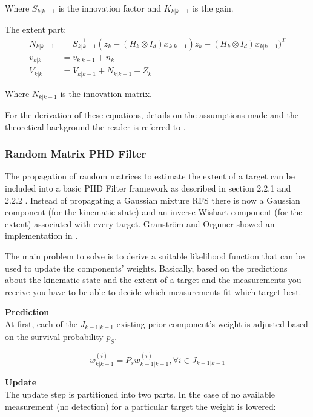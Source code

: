 Where $S_{k|k-1}$ is the innovation factor and $K_{k|k-1}$ is the gain.

The extent part:
\begin{equation}
\begin{split}
    N_{k|k-1} &= S_{k|k-1}^{-1} (z_k -(H_k \otimes I_d)x_{k|k-1}) z_k - (H_k \otimes I_d) x_{k|k-1})^T \\
    v_{k|k} &= v_{k|k-1} + n_k \\
    V_{k|k} &= V_{k|k-1} + N_{k|k-1} + Z_k
\end{split}
\label{eq:ellip_update_ext}
\end{equation}

Where $N_{k|k-1}$ is the innovation matrix.

For the derivation of these equations, details on the assumptions made and the theoretical background the reader is referred to \cite{koch2008elliptical}.

\subsubsection{Random Matrix PHD Filter}
The propagation of random matrices to estimate the extent of a target can be included into a basic PHD Filter framework as described in section 2.2.1 and 2.2.2 . Instead of propagating a Gaussian mixture RFS there is now a Gaussian component (for the kinematic state) and an inverse Wishart component (for the extent) associated with every target. Granström and Orguner showed an implementation in \cite{granstrEllipPHD2012}.

The main problem to solve is to derive a suitable likelihood function that can be used to update the components' weights. Basically, based on the predictions about the kinematic state and the extent of a target and the measurements you receive you have to be able to decide which measurements fit which target best.

\textbf{Prediction}\\
At first, each of the $J_{k-1|k-1}$ existing prior component's weight is adjusted based on the survival probability $p_S$.

\begin{equation}
    w^{(i)}_{k|k-1} = P_sw^{(i)}_{k-1|k-1}, \forall i \in J_{k-1|k-1}
    \label{eq:giw_phd_weight_pred}
\end{equation}

\textbf{Update}\\
The update step is partitioned into two parts. In the case of no available measurement (no detection) for a particular target the weight is lowered:

